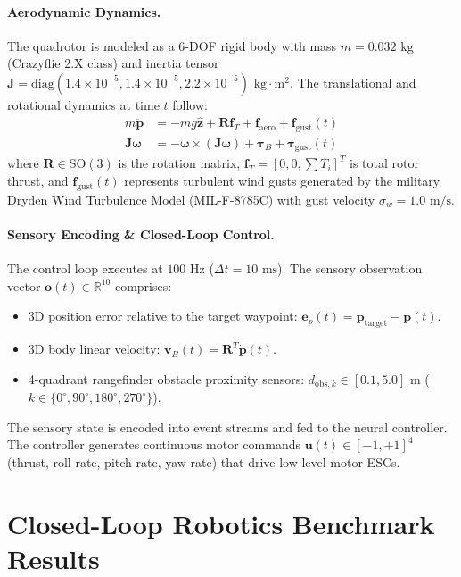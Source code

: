 \documentclass[11pt,letterpaper]{report}
\begin{document}
\paragraph{Aerodynamic Dynamics.}
The quadrotor is modeled as a 6-DOF rigid body with mass $m = 0.032\text{ kg}$ (Crazyflie 2.X class) and inertia tensor $\mathbf{J} = \mathrm{diag}(1.4\times 10^{-5}, 1.4\times 10^{-5}, 2.2\times 10^{-5})\text{ kg}\cdot\text{m}^2$. The translational and rotational dynamics at time $t$ follow:
\begin{align}
m \ddot{\mathbf{p}} &= -m g \hat{\mathbf{z}} + \mathbf{R} \mathbf{f}_T + \mathbf{f}_{\mathrm{aero}} + \mathbf{f}_{\mathrm{gust}}(t) \\
\mathbf{J} \dot{\boldsymbol{\omega}} &= -\boldsymbol{\omega} \times (\mathbf{J} \boldsymbol{\omega}) + \boldsymbol{\tau}_B + \boldsymbol{\tau}_{\mathrm{gust}}(t)
\end{align}
where $\mathbf{R} \in \mathrm{SO}(3)$ is the rotation matrix, $\mathbf{f}_T = [0, 0, \sum T_i]^T$ is total rotor thrust, and $\mathbf{f}_{\mathrm{gust}}(t)$ represents turbulent wind gusts generated by the military Dryden Wind Turbulence Model (MIL-F-8785C) with gust velocity $\sigma_w = 1.0\text{ m/s}$.

\paragraph{Sensory Encoding \& Closed-Loop Control.}
The control loop executes at $100\text{ Hz}$ ($\Delta t = 10\text{ ms}$). The sensory observation vector $\mathbf{o}(t) \in \mathbb{R}^{10}$ comprises:
\begin{itemize}[leftmargin=*]
    \item 3D position error relative to the target waypoint: $\mathbf{e}_p(t) = \mathbf{p}_{\mathrm{target}} - \mathbf{p}(t)$.
    \item 3D body linear velocity: $\mathbf{v}_B(t) = \mathbf{R}^T \dot{\mathbf{p}}(t)$.
    \item 4-quadrant rangefinder obstacle proximity sensors: $d_{\mathrm{obs}, k} \in [0.1, 5.0]\text{ m}$ ($k \in \{0^\circ, 90^\circ, 180^\circ, 270^\circ\}$).
\end{itemize}
The sensory state is encoded into event streams and fed to the neural controller. The controller generates continuous motor commands $\mathbf{u}(t) \in [-1, +1]^4$ (thrust, roll rate, pitch rate, yaw rate) that drive low-level motor ESCs.

\section{Closed-Loop Robotics Benchmark Results}
\end{document}
